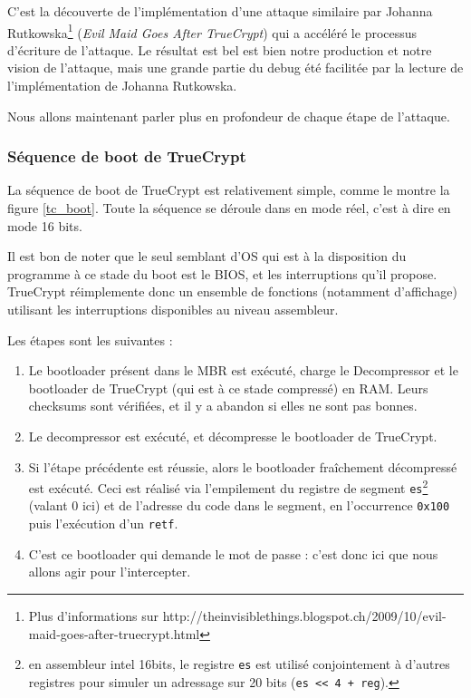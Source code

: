 \documentclass[12pt,a4paper]{article}
\begin{document}
C'est la découverte de l'implémentation d'une attaque similaire par Johanna
Rutkowska\footnote{Plus d'informations sur
http://theinvisiblethings.blogspot.ch/2009/10/evil-maid-goes-after-truecrypt.html}
(\textit{Evil Maid Goes After TrueCrypt}) qui a accéléré le processus
d'écriture de l'attaque. Le résultat est bel est bien notre production et notre
vision de l'attaque, mais une grande partie du debug été facilitée par la
lecture de l'implémentation de Johanna Rutkowska.

Nous allons maintenant parler plus en profondeur de chaque étape de l'attaque.

\subsubsection{Séquence de boot de TrueCrypt}

La séquence de boot de TrueCrypt est relativement simple, comme le montre la
figure \ref{tc_boot}. Toute la séquence se déroule dans en mode réel, c'est à dire
en mode 16 bits.

Il est bon de noter que le seul semblant d'OS qui est à la disposition du
programme à ce stade du boot est le BIOS, et les interruptions qu'il propose.
TrueCrypt réimplemente donc un ensemble de fonctions (notamment d'affichage)
utilisant les interruptions disponibles au niveau assembleur.

Les étapes sont les suivantes :
\begin{enumerate}
    \item Le bootloader présent dans le MBR est exécuté, charge le Decompressor
    et le bootloader de TrueCrypt (qui est à ce stade compressé) en RAM. Leurs
    checksums sont vérifiées, et il y a abandon si elles ne sont pas bonnes.
    \item Le decompressor est exécuté, et décompresse le bootloader de
    TrueCrypt.
    \item Si l'étape précédente est réussie, alors le bootloader fraîchement
    décompressé est exécuté. Ceci est réalisé via l'empilement du registre de
    segment \texttt{es}\footnote{en assembleur intel 16bits, le registre
    \texttt{es} est utilisé conjointement à d'autres registres pour simuler un
    adressage sur 20 bits (\texttt{es << 4 + reg}).} (valant 0 ici) et de
    l'adresse du code dans le segment, en l'occurrence \texttt{0x100} puis
    l'exécution d'un \texttt{retf}.  \item C'est ce bootloader qui demande le
    mot de passe : c'est donc ici que nous allons agir pour l'intercepter.
\end{enumerate}
\end{document}
